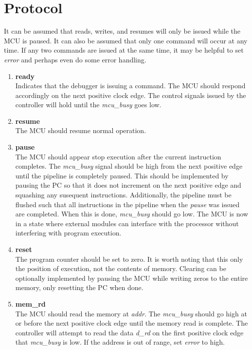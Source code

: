 \documentclass[10pt,a4paper]{article}
\begin{document}
\section{Protocol}

It can be assumed that reads, writes, and resumes will only be issued while the MCU is paused. It
can also be assumed that only one command will occur at any time. If any two commands are issued at the
same time, it may be helpful to set \emph{error} and perhaps even do some error handling.

\begin{enumerate}

    \item\textbf{ready}\\
    Indicates that the debugger is issuing a command. The MCU should respond accordingly on the next positive clock edge.
    The control signals issued by the controller will hold until the \emph{mcu\_busy} goes low.

    \item\textbf{resume}\\
    The MCU should resume normal operation.

    \newpage
    \item\textbf{pause}\\
    The MCU should appear stop execution after the current instruction completes. The
    \emph{mcu\_busy} signal should be high from the next positive edge until the pipeline is
    completely paused. This should be implemented by pausing the PC so that it does not increment
    on the next positive edge and squashing any susequent instructions. Additionally, the pipeline
    must be flushed such that all instructions in the pipeline when the \emph{pause} was
    issued are completed. When this is done, \emph{mcu\_busy} should go low. The MCU is now in a
    state where external modules can interface with the processor without interfering with
    program execution.

    \item\textbf{reset}\\
    The program counter should be set to zero. It is worth noting that this only the position of
    execution, not the contents of memory. Clearing can be optionally implemented by
    pausing the MCU while writing zeros to the entire memory, only resetting the PC when done.

    \item\textbf{mem\_rd}\\
    The MCU should read the memory at \emph{addr}. The \emph{mcu\_busy} should go
     high at or before the next positive clock edge until the memory read is complete. The
    controller will attempt to read the data \emph{d\_rd} on the first positive clock edge that
    \emph{mcu\_busy} is low. If the address is out of range, set \emph{error} to high.
    

\end{enumerate}
\end{document}
